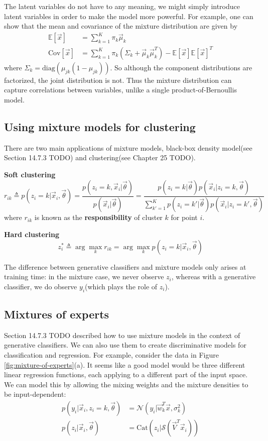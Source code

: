 The latent variables do not have to any meaning, we might simply introduce latent variables in order to make the model more powerful. For example, one can show that the mean and covariance of the mixture distribution are given by
\begin{align}
\mathbb{E}[\vec{x}] & = \sum\limits_{k=1}^K \pi_k\vec{\mu}_k \\
\mathrm{Cov}[\vec{x}] & = \sum\limits_{k=1}^K \pi_k(\Sigma_k+\vec{\mu}_k\vec{\mu}_k^T)-\mathbb{E}[\vec{x}]\mathbb{E}[\vec{x}]^T
\end{align}
where $\Sigma_k=\mathrm{diag}(\mu_{jk}(1-\mu_{jk}))$. So although the component distributions are factorized, the joint distribution is not. Thus the mixture distribution can capture correlations between variables, unlike a single product-of-Bernoullis model.




\subsection{Using mixture models for clustering}
There are two main applications of mixture models, black-box density model(see Section 14.7.3 TODO) and clustering(see Chapter 25 TODO).

\textbf{Soft clustering}
\begin{equation}
r_{ik} \triangleq p(z_i=k|\vec{x}_i,\vec{\theta})=\dfrac{p(z_i=k,\vec{x}_i|\vec{\theta})}{p(\vec{x}_i|\vec{\theta})}=\dfrac{p(z_i=k|\vec{\theta})p(\vec{x}_i|z_i=k,\vec{\theta})}{\sum_{k'=1}^K p(z_i=k'|\vec{\theta})p(\vec{x}_i|z_i=k',\vec{\theta})}
\end{equation}
where $r_{ik}$ is known as the \textbf{responsibility} of cluster $k$ for point $i$.

\textbf{Hard clustering}
\begin{equation}
z_i^* \triangleq \arg\max_k r_{ik}=\arg\max_k p(z_i=k|\vec{x}_i,\vec{\theta})
\end{equation}

The difference between generative classifiers and mixture models only arises at training time: in the mixture case, we never observe $z_i$, whereas with a generative classifier, we do observe $y_i$(which plays the role of $z_i$).


\subsection{Mixtures of experts}
Section 14.7.3 TODO described how to use mixture models in the context of generative classifiers. We can also use them to create discriminative models for classification and regression. For example, consider the data in Figure \ref{fig:mixture-of-experts}(a). It seems like a good model would be three different linear regression functions, each applying to a different part of the input space. We can model this by allowing the mixing weights and the mixture densities to be input-dependent:
\begin{align}
p(y_i|\vec{x}_i,z_i=k,\vec{\theta}) & =\mathcal{N}(y_i|\vec{w}_k^T\vec{x},\sigma_k^2) \\
p(z_i | \vec{x}_i,\vec{\theta}) & = \mathrm{Cat}(z_i|\mathcal{S}(\vec{V}^T\vec{x}_i))
\end{align}

